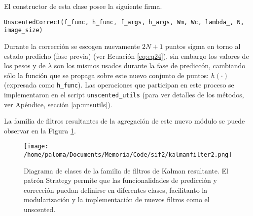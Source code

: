 El constructor de esta clase posee la siguiente firma.

\bigskip
\begin{center}
\texttt{UnscentedCorrect(f\_func, h\_func, f\_args, h\_args,  Wm, Wc, lambda\_, N, image\_size)}
\end{center}

Durante la correcci\'on se escogen nuevamente $2N+1$ puntos sigma en torno al estado predicho (fase previa) (ver Ecuaci\'on \ref{eq:eq24}), sin embargo los valores de los pesos y de $\lambda$ son los mismos usados durante la fase de predicc\'on, cambiando s\'olo la funci\'on que se propaga sobre este nuevo conjunto de puntos: $h(\cdot)$ (expresada como \texttt{h\_func}). Las operaciones que participan en este proceso se implementaron en el script \texttt{unscented\_utils} (para ver detalles de los m\'etodos, ver Ap\'endice, secci\'on \ref{ap:unsutils}).
\bigskip

La familia de filtros resultantes de la agregaci\'on de este nuevo m\'odulo se puede observar en la Figura \ref{fig:kalmanfilter2}.

\begin{figure}
\centering
\texttt{[image: /home/paloma/Documents/Memoria/Code/sif2/kalmanfilter2.png]}
\caption{Diagrama de clases de la familia de filtros de Kalman resultante. El patr\'on Strategy permite que las funcionalidades de predicci\'on y correcci\'on puedan definirse en diferentes clases, facilitanto la modularizaci\'on y la implementaci\'on de nuevos filtros como el unscented. }
\label{fig:kalmanfilter2}
\end{figure}